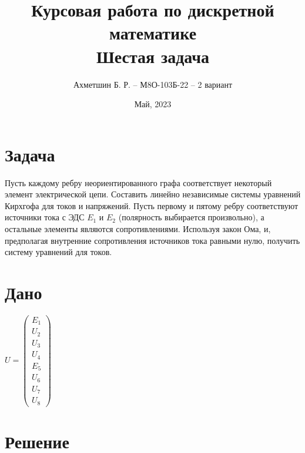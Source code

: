 \documentclass{article}
\title{Курсовая работа по дискретной математике\\Шестая задача}
\author{Ахметшин Б. Р. -- М8О-103Б-22 -- 2 вариант}
\date{Май, 2023}
\begin{document}
\maketitle

\section*{Задача}
\large
Пусть каждому ребру неориентированного графа соответствует некоторый элемент
электрической цепи. Составить линейно независимые системы уравнений Кирхгофа для токов и
напряжений. Пусть первому и пятому ребру соответствуют источники тока с ЭДС $E_1$ и $E_2$
(полярность выбирается произвольно), а остальные элементы являются сопротивлениями. Используя
закон Ома, и, предполагая внутренние сопротивления источников тока равными нулю, получить
систему уравнений для токов.

\section*{Дано}

\begin{center}
\end{center}

$U = 
\begin{pmatrix}
    E_1 \\
    U_2 \\
    U_3 \\
    U_4 \\
    E_5 \\
    U_6 \\
    U_7 \\
    U_8 
\end{pmatrix}
$

\section*{Решение}
\end{document}
